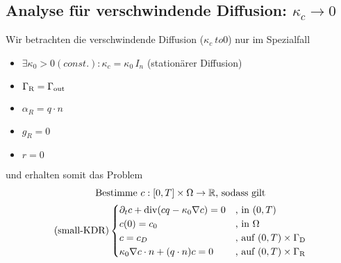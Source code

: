 \subsection{Analyse für verschwindende Diffusion: $ \kappa_c \to 0 $}
\label{Analyse für verschwindende Diffusion}
Wir betrachten die verschwindende Diffusion ($ \kappa_c \ to 0 $) nur im Spezialfall
\begin{itemize}
	\item  $ \exists \kappa_0 > 0 (const.): \kappa_c = \kappa_0 \, I_n $ (stationärer Diffusion)
	\item $ \Gamma_{\text{R}} = \Gamma_{{\text{out}}} $
	\item $ \alpha_R = q \cdot n $
	\item $ g_R = 0 $
	\item $ r = 0 $
\end{itemize}
und erhalten somit das Problem
\begin{gather*}
	\text{Bestimme }  c:[0,T] \times \Omega \to \R \text{, sodass gilt}\\
	\sDKDR\begin{cases}
		\partial_t c + \dive(c q - \kappa_0 \nabla c) = 0 &\text{, in } (0,T) \time \Omega\\
		c(0) = c_0  &\text{, in } \Omega\\
		c = c_D &\text{, auf } (0,T) \times \GammaD \\
		\kappa_0 \nabla c \cdot n + (q \cdot n) c = 0 &\text{, auf } (0,T) \times \GammaR
	\end{cases}
\end{gather*}

